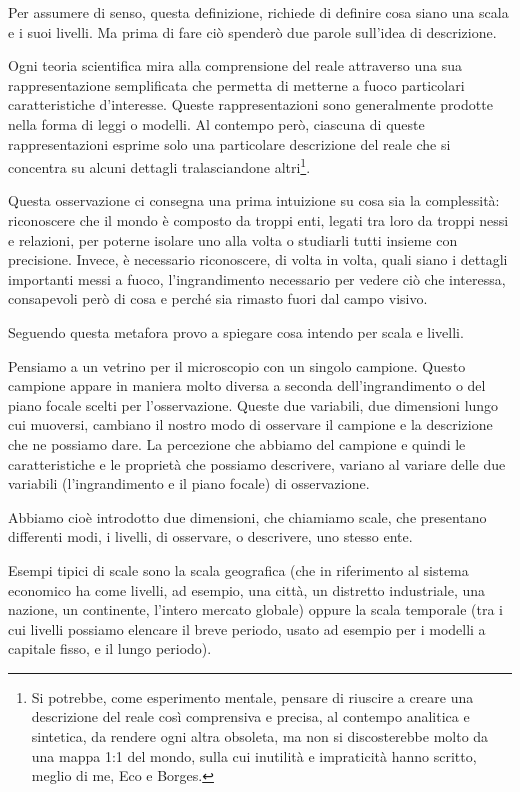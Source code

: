 \documentclass[a4paper, headings=standardclasses]{scrartcl}
\begin{document}
Per assumere di senso, questa definizione, richiede di definire cosa siano una scala e i suoi livelli. Ma prima di fare ciò spenderò due parole sull'idea di descrizione.

Ogni teoria scientifica mira alla comprensione del reale attraverso una sua rappresentazione semplificata che permetta di metterne a fuoco particolari caratteristiche d'interesse. Queste rappresentazioni sono generalmente prodotte nella forma di leggi o modelli.
Al contempo però, ciascuna di queste rappresentazioni esprime solo una particolare descrizione del reale che si concentra su alcuni dettagli tralasciandone altri\footnote{Si potrebbe, come esperimento mentale, pensare di riuscire a creare una descrizione del reale così comprensiva e precisa, al contempo analitica e sintetica, da rendere ogni altra obsoleta, ma non si discosterebbe molto da una mappa 1:1 del mondo, sulla cui inutilità e impraticità hanno scritto, meglio di me, Eco e Borges.}.

Questa osservazione ci consegna una prima intuizione su cosa sia la complessità: riconoscere che il mondo è composto da troppi enti, legati tra loro da troppi nessi e relazioni, per poterne isolare uno alla volta o studiarli tutti insieme con precisione. Invece, è necessario riconoscere, di volta in volta, quali siano i dettagli importanti messi a fuoco, l'ingrandimento necessario per vedere ciò che interessa, consapevoli però di cosa e perché sia rimasto fuori dal campo visivo.

Seguendo questa metafora provo a spiegare cosa intendo per scala e livelli.

Pensiamo a un vetrino per il microscopio con un singolo campione. Questo campione appare
in maniera molto diversa a seconda dell'ingrandimento o del piano focale scelti per l'osservazione.
Queste due variabili, due dimensioni lungo cui muoversi, cambiano il nostro modo di osservare il campione e la descrizione che ne possiamo dare.
La percezione che abbiamo del campione e quindi le caratteristiche e le proprietà che possiamo
descrivere, variano al variare delle due variabili (l'ingrandimento e il piano focale) di osservazione.

Abbiamo cioè introdotto due dimensioni, che chiamiamo scale, che presentano differenti modi, i livelli, di osservare, o descrivere, uno stesso ente.

Esempi tipici di scale sono la scala geografica (che in riferimento al sistema economico ha come livelli, ad esempio, una città, un distretto industriale, una nazione, un continente, l'intero
mercato globale) oppure la scala temporale (tra i cui livelli possiamo elencare il breve periodo, usato ad esempio per i modelli a capitale fisso, e il lungo periodo).
\end{document}

